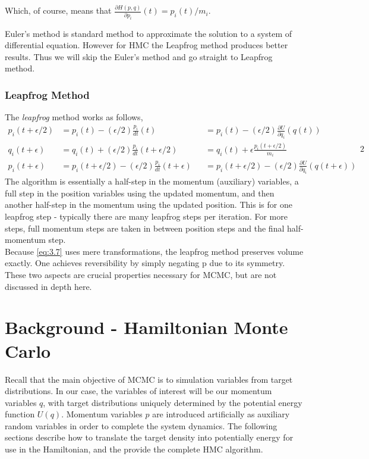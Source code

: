 \documentclass{article}
\numberwithin{equation}{section}
\begin{document}
Which, of course, means that $\frac{\partial H(p,q)}{\partial p_i}(t) = p_i(t)/m_i$.

Euler's method is standard method to approximate the solution to a system of differential equation. However for HMC the Leapfrog method produces better results. Thus we will skip the Euler's method and go straight to Leapfrog method.

\subsubsection{Leapfrog Method}
The \textit{leapfrog} method works as follows,
\begin{equation}
\begin{alignedat}{2}
p_i(t+\epsilon/2) &=  p_i(t) - (\epsilon/2)\frac{p_i}{dt}(t) &&=   p_i(t) - (\epsilon/2)\frac{\partial U}{\partial q_i}(q(t))\\
q_i(t+\epsilon)   &= q_i(t) + (\epsilon/2)\frac{p_i}{dt}(t + \epsilon/2) &&=  q_i(t) + \epsilon \frac{p_i(t+\epsilon/2)}{m_i}\\
p_i(t+\epsilon) &= p_i(t + \epsilon/2) - (\epsilon/2)\frac{p_i}{dt}(t + \epsilon) &&= p_i(t+\epsilon/2) - (\epsilon/2)\frac{\partial U}{\partial q_i}(q(t+\epsilon))
\label{eq:3.7}
\end{alignedat}{2}
\end{equation}
The algorithm is essentially a half-step in the momentum (auxiliary) variables, a full step in the position variables using the updated momentum, and then another half-step in the momentum using the updated position. This is for one leapfrog step - typically there are many leapfrog steps per iteration. For more steps, full momentum steps are taken in between position steps and the final half-momentum step.\\

Because \ref{eq:3.7} uses mere transformations, the leapfrog method preserves volume exactly. One achieves reversibility by simply negating p due to its symmetry. These two aspects are crucial properties necessary for MCMC, but are not discussed in depth here.

\section{Background - Hamiltonian Monte Carlo}
Recall that the main objective of MCMC is to simulation variables from target distributions. In our case, the variables of interest will be our momentum variables $q$, with target distributions uniquely determined by the potential energy function $U(q)$. Momentum variables $p$ are introduced artificially as auxiliary random variables in order to complete the system dynamics. The following sections describe how to translate the target density into potentially energy for use in the Hamiltonian, and the provide the complete HMC algorithm.\\
\end{document}
